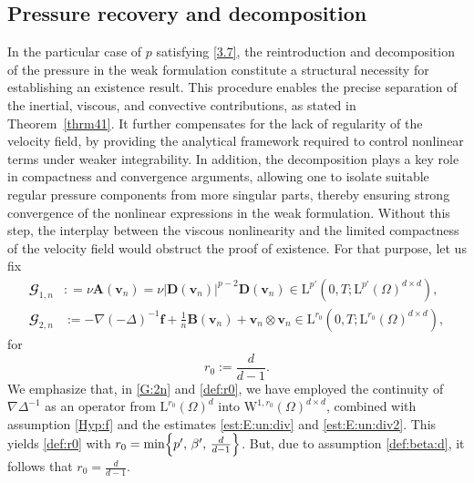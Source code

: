\documentclass[12pt,reqno]{amsart}
\numberwithin{equation}{section}
\let\originalleft\left
\let\originalright\right
\renewcommand{\left}{\mathopen{}\mathclose\bgroup\originalleft}
\renewcommand{\right}{\aftergroup\egroup\originalright}
\theoremstyle{definition}
\def\1{\Omega}
\def\W{\mathrm{W}}
\def\L{\mathrm{L}}
\def\vv{\boldsymbol{v}}
\def\f{\boldsymbol{f}}
\def\bfB{\mathbf{B}}
\def\bfD{\mathbf{D}}
\def\bfA{\mathbf{A}}
\def\bcG{\mathbfcal{G}}
\begin{document}
\subsection{Pressure recovery and decomposition}\label{Subs:Press:Dec}
{
In the particular case of $p$ satisfying \eqref{3.7},} the reintroduction and decomposition of the pressure in the weak formulation constitute a structural necessity for establishing an existence result.
This procedure enables the precise separation of the inertial, viscous, and convective contributions, as stated in Theorem~\ref{thrm41}.
It further compensates for the lack of regularity of the velocity field, by providing the analytical framework required to control nonlinear terms under weaker integrability.
In addition, the decomposition plays a key role in compactness and convergence arguments, allowing one to isolate suitable regular pressure components from more singular parts, thereby ensuring strong convergence of the nonlinear expressions in the weak formulation.
Without this step, the interplay between the viscous nonlinearity and the limited compactness of the velocity field would obstruct the proof of existence.
For that purpose, let us fix
\begin{align}
	\bcG_{1,n}&: =\nu  \bfA(\vv_n)=\nu  |\bfD(\vv_n)|^{p-2}\bfD(\vv_n)\in \L^{p'}(0,T;\L^{p'}(\1)^{d\times d}), \label{G:1n}\\
	\bcG_{2,n}&:= -\nabla(-\Delta)^{-1}\f+\frac{1}{n}\bfB(\vv_n)+\vv_n\otimes\vv_n\in \L^{r_0}(0,T;\L^{r_0}(\1)^{d\times d}),
\label{G:2n}
\end{align}
for
{
\begin{equation}\label{def:r0}
r_0:=\frac{d}{d-1}.
\end{equation}
We emphasize that, in \eqref{G:2n} and \eqref{def:r0}, we have employed the continuity of
$\nabla \Delta^{-1}$ as an operator from $\L^{r_0}(\1)^d$ into
$\W^{1,r_0}(\1)^{d \times d}$, combined with assumption \eqref{Hyp:f} and the estimates
\eqref{est:E:un:div} and \eqref{est:E:un:div2}.
This yields \eqref{def:r0} with
$r_0=\min\left\{ p',\, \beta',\, \frac{d}{d-1} \right\}$.
But, due to assumption \eqref{def:beta:d}, it follows that $r_0 = \frac{d}{d-1}$.
}
\end{document}

